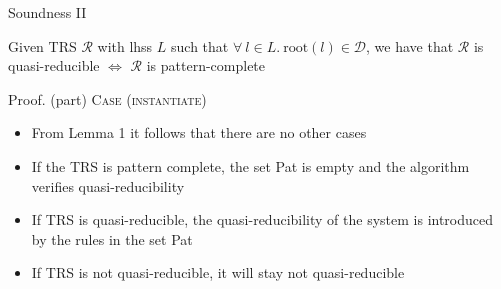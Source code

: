 \begin{frame}{Soundness II}
\begin{lemma}
    Given TRS $\mathcal{R}$ with lhss $L$ such that $\forall\ l \in L.\ \text{root}(l) \in \mathcal{D}$, we have that $\mathcal{R}$ is quasi-reducible $\iff$ $\mathcal{R}$ is pattern-complete
\end{lemma}

\begin{block}{Proof. (part)}
\textsc{Case (instantiate)}
\begin{itemize}
    \item From Lemma 1 it follows that there are no other cases
    \item If the TRS is pattern complete, the set Pat is empty and the algorithm  verifies quasi-reducibility
    \item If TRS is quasi-reducible, the quasi-reducibility of the system is introduced by the rules in the set Pat
    \item If TRS is not quasi-reducible, it will stay not quasi-reducible
\end{itemize}
\end{block}
\end{frame}
